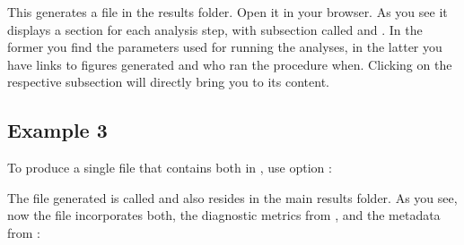 \documentclass[letterpaper,10pt,english]{sphinxmanual}
\let\sphinxpxdimen\pdfpxdimen\else\newdimen\sphinxpxdimen
\begin{document}
%
\begin{sphinxVerbatim}[commandchars=\\\{\}]
     
\end{sphinxVerbatim}

This generates a file  in the results folder. Open it in your browser. As you see it displays a
section for each analysis step, with subsection called  and . In the former you find the parameters
used for running the analyses, in the latter you have links to figures generated and who ran the procedure when. Clicking
on the respective subsection will directly bring you to its content.

\noindent{\hspace*{\fill}\sphinxincludegraphics[width=500\sphinxpxdimen]{{md_metadata_odml}.png}\hspace*{\fill}}


\subsection{Example 3}
\label{\detokenize{access_metadata:example-3}}
To produce a single file that contains both  in , use option :

%
\begin{sphinxVerbatim}[commandchars=\\\{\}]
      
\end{sphinxVerbatim}

The file generated is called  and also resides in the main results folder.
As you see, now the file incorporates both, the diagnostic metrics from {\hyperref[\detokenize{access_metadata:example1-meta}]{}}, and the metadata from {\hyperref[\detokenize{access_metadata:example2-meta}]{}}:
\end{document}
